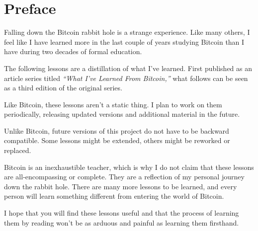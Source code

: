 \chapter*{Preface}

Falling down the Bitcoin rabbit hole is a strange experience. Like many others,
I feel like I have learned more in the last couple of years studying Bitcoin
than I have during two decades of formal education.

The following lessons are a distillation of what I’ve learned. First published
as an article series titled \textit{“What I’ve Learned From Bitcoin,”} what follows
can be seen as a third edition of the original series.

Like Bitcoin, these lessons aren't a static thing. I plan to work on them
periodically, releasing updated versions and additional material in the future.

Unlike Bitcoin, future versions of this project do not have to be backward
compatible. Some lessons might be extended, others might be reworked or
replaced.

Bitcoin is an inexhaustible teacher, which is why I do not claim that these
lessons are all-encompassing or complete. They are a reflection of my personal
journey down the rabbit hole. There are many more lessons to be learned, and
every person will learn something different from entering the world of Bitcoin.

I hope that you will find these lessons useful and that the process of learning
them by reading won’t be as arduous and painful as learning them firsthand.

%
%
